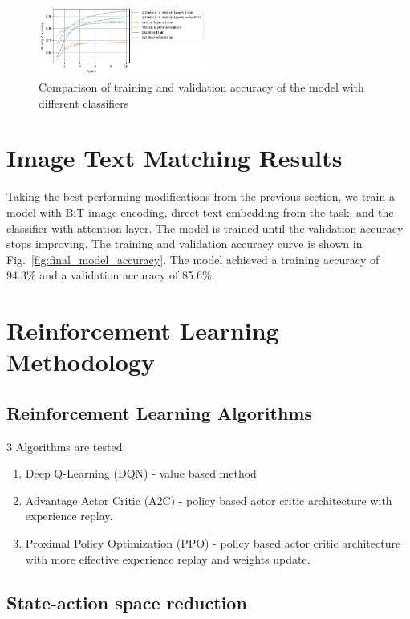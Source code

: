 \documentclass[conference]{IEEEtran}
\begin{document}
\begin{figure}
    \centering
    \includegraphics[width=0.49\textwidth]{classifier_comparison.png}
    \caption{Comparison of training and validation accuracy of the model with different classifiers}
    \label{fig:classifier_comparison}
\end{figure}

\section{Image Text Matching Results}

Taking the best performing modifications from the previous section, we train a model with BiT image encoding, direct text embedding from the task, and the classifier with attention layer. The model is trained until the validation accuracy stops improving. The training and validation accuracy curve is shown in Fig.~\ref{fig:final_model_accuracy}. The model achieved a training accuracy of 94.3\% and a validation accuracy of 85.6\%.



\section{Reinforcement Learning Methodology}

\subsection{Reinforcement Learning Algorithms}

3 Algorithms are tested:

\begin{enumerate}
    \item Deep Q-Learning (DQN) - value based method
    \item Advantage Actor Critic (A2C) - policy based actor critic architecture with experience replay.
    \item Proximal Policy Optimization (PPO) - policy based actor critic architecture with more effective experience replay and weights update.
\end{enumerate}

\subsection{State-action space reduction}
\end{document}
